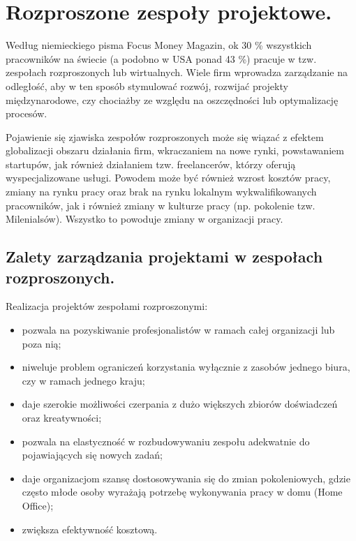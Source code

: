 
\chapter{Rozproszone zespoły projektowe.}

Według niemieckiego pisma Focus Money Magazin, ok 30 \% wszystkich pracowników na świecie (a podobno w USA ponad 43 \%) pracuje w tzw. zespołach rozproszonych lub wirtualnych. Wiele firm wprowadza zarządzanie na odległość, aby w ten sposób stymulować rozwój, rozwijać projekty międzynarodowe, czy chociażby ze względu na oszczędności lub optymalizację procesów.

Pojawienie się zjawiska zespołów rozproszonych może się wiązać z efektem globalizacji obszaru działania firm, wkraczaniem na nowe rynki, powstawaniem startupów, jak również działaniem tzw. freelancerów, którzy oferują wyspecjalizowane usługi. Powodem może być również wzrost kosztów pracy, zmiany na rynku pracy oraz brak na rynku lokalnym wykwalifikowanych pracowników, jak i również zmiany w kulturze pracy (np. pokolenie tzw. Milenialsów). Wszystko to powoduje zmiany w organizacji pracy.

\section{Zalety zarządzania projektami w zespołach rozproszonych.}

Realizacja projektów zespołami rozproszonymi:

\begin{itemize}
	\item pozwala na pozyskiwanie profesjonalistów w ramach całej organizacji lub poza nią;
	\item niweluje problem ograniczeń korzystania wyłącznie z zasobów jednego biura, czy w ramach jednego kraju;
	\item daje szerokie możliwości czerpania z dużo większych zbiorów doświadczeń oraz kreatywności;
	\item pozwala na elastyczność w rozbudowywaniu zespołu adekwatnie do pojawiających się nowych zadań;
	\item daje organizacjom szansę dostosowywania się do zmian pokoleniowych, gdzie często młode osoby wyrażają potrzebę wykonywania pracy w domu (Home Office);
	\item zwiększa efektywność kosztową.
\end{itemize}

